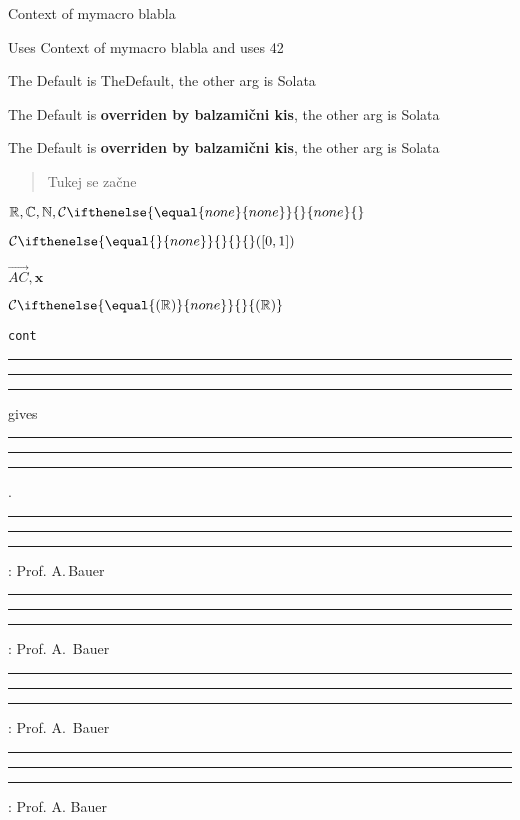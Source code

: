 \documentclass[a4paper]{article}
\newcommand{\mymacro}{Context of mymacro blabla}
\newcommand{\withargs}[2]{Uses #1 and uses #2}
\newcommand{\withdefvalues}[2][TheDefault]{The Default is #1, the other arg is #2}
\newcommand{\RR}{\mathbb{R}}
\newcommand{\CC}{\mathbb{C}}
\newcommand{\NN}{\mathbb{N}}
\newcommand{\cont}[1][none]{\mathcal{C} \ifthenelse{\equal{#1}{none}}{}{#1}}
\newcommand{\contOn}[2]{([#1,#2])}
\newcommand{\vectArrow}[1]{\overrightarrow{#1}}
\newcommand{\vect}[1]{\mathbf{#1}}
\newcommand{\cmd}[1]{\texttt{\color{blue}{\textbackslash}#1}}
\newcommand{\demolenght}[1]{\rule{0.1pt}{5pt}\rule{#1}{0.1pt}\rule{0.1pt}{5pt}}
\begin{document}
\mymacro{}

\withargs{\mymacro}{42}

\withdefvalues{Solata}

\withdefvalues[{\textbf{overriden by balzamični kis}}]{Solata}

\withdefvalues[{\textbf{overriden by balzamični kis}}]%
{Solata}

\begin{abstract}
    Tukej se začne    
\end{abstract}


$\RR{},\CC{},\NN{},\cont{}$

$\cont[]{} \contOn{0}{1}$

$\vectArrow{AC}, \vect{x}$

$\cont[(\RR)]$

\cmd{cont}

\demolenght{1em}
 gives \demolenght{6pt}.

 \demolenght{\widthof{\,}}: Prof. A.\,Bauer

 \demolenght{\widthof{\ }}: Prof. A.\ Bauer

 \demolenght{\widthof{~}}: Prof. A.~Bauer

 \demolenght{\widthof{ }}: Prof. A. Bauer
\end{document}
